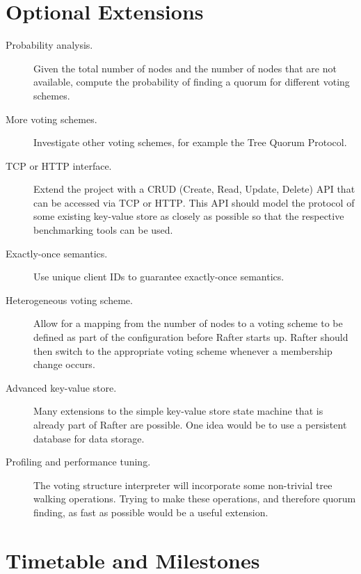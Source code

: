 \documentclass[12pt]{scrartcl}
\begin{document}
\section{Optional Extensions%
  \label{optional-extensions}%
}
%
\begin{description}

\item[Probability analysis.] Given the total number of nodes and the number of nodes that are not available, compute the probability of finding a quorum for different voting schemes.

\item[More voting schemes.] Investigate other voting schemes, for example the Tree Quorum Protocol.

\item[\textsc{TCP} or \textsc{HTTP} interface.] Extend the project with a \textsc{CRUD} (Create, Read, Update, Delete) \textsc{API} that can be accessed via \textsc{TCP} or \textsc{HTTP}. This \textsc{API} should model the protocol of some existing key-value store as closely as possible so that the respective benchmarking tools can be used.

\item[Exactly-once semantics.] Use unique client IDs to guarantee exactly-once semantics.

\item[Heterogeneous voting scheme.] Allow for a mapping from the number of nodes to a voting scheme to be defined as part of the configuration before Rafter starts up. Rafter should then switch to the appropriate voting scheme whenever a membership change occurs.

\item[Advanced key-value store.] Many extensions to the simple key-value store state machine that is already part of Rafter are possible. One idea would be to use a persistent database for data storage.

\item[Profiling and performance tuning.] The voting structure interpreter will incorporate some non-trivial tree walking operations. Trying to make these operations, and therefore quorum finding, as fast as possible would be a useful extension.

\end{description}


\section{Timetable and Milestones%
  \label{timetable-and-milestones}%
}
\end{document}
